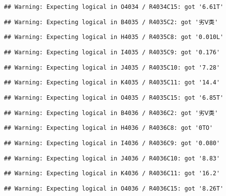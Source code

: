 \documentclass[
]{article}
\begin{document}
\begin{verbatim}
## Warning: Expecting logical in O4034 / R4034C15: got '6.61T'
\end{verbatim}

\begin{verbatim}
## Warning: Expecting logical in B4035 / R4035C2: got '劣Ⅴ类'
\end{verbatim}

\begin{verbatim}
## Warning: Expecting logical in H4035 / R4035C8: got '0.010L'
\end{verbatim}

\begin{verbatim}
## Warning: Expecting logical in I4035 / R4035C9: got '0.176'
\end{verbatim}

\begin{verbatim}
## Warning: Expecting logical in J4035 / R4035C10: got '7.28'
\end{verbatim}

\begin{verbatim}
## Warning: Expecting logical in K4035 / R4035C11: got '14.4'
\end{verbatim}

\begin{verbatim}
## Warning: Expecting logical in O4035 / R4035C15: got '6.85T'
\end{verbatim}

\begin{verbatim}
## Warning: Expecting logical in B4036 / R4036C2: got '劣Ⅴ类'
\end{verbatim}

\begin{verbatim}
## Warning: Expecting logical in H4036 / R4036C8: got '0TO'
\end{verbatim}

\begin{verbatim}
## Warning: Expecting logical in I4036 / R4036C9: got '0.080'
\end{verbatim}

\begin{verbatim}
## Warning: Expecting logical in J4036 / R4036C10: got '8.83'
\end{verbatim}

\begin{verbatim}
## Warning: Expecting logical in K4036 / R4036C11: got '16.2'
\end{verbatim}

\begin{verbatim}
## Warning: Expecting logical in O4036 / R4036C15: got '8.26T'
\end{verbatim}
\end{document}

